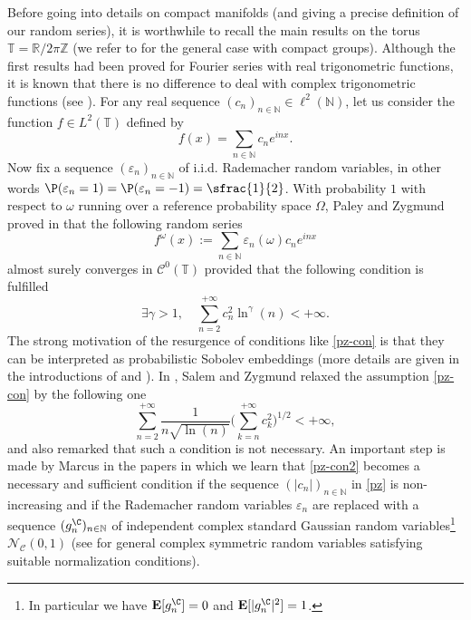 \documentclass[JEP,XML,SOM,Unicode,NoEqCountersInSection,published]{cedram}
\theoremstyle{theorem}
\theoremstyle{definition}
\newcommand\R{\mathbb{R}}
\newcommand\E{\mathbf{E}}
\newcommand\N{\mathbb{N}}
\newcommand\Z{\mathbb{Z}}
\newcommand\CC{\mathcal{C}}
\newcommand\ep{\varepsilon}
\begin{document}
Before going into details on compact manifolds (and giving a precise definition of our random series), it is worthwhile to recall the main results on the torus $\mathbb{T}=\R/ 2\pi \Z$ (we refer to \cite{pisier1981} for the general case with compact groups). Although the first results had been proved for Fourier series with real trigonometric functions, it is known that there is no difference to deal with complex trigonometric functions (see \cite[p.\,122]{pisier1981}). For any real sequence $(c_n)_{n\in \N}\in \ell^2(\N)$, let us consider the function $f\in L^2(\mathbb{T})$ defined by
\begin{equation*}
f(x)=\sum_{n\in \N}c_n e^{inx}.
\end{equation*}
Now fix a sequence $(\varepsilon_n)_{n\in \N}$ of i.i.d. Rademacher random variables, in other words $\P(\varepsilon_n=1)=\P(\varepsilon_n=-1)=\sfrac{1}{2}$.
With probability $1$ with respect to $\omega$ running over a reference probability space $\Omega$, Paley and Zygmund proved in \cite[p.\,347]{paley1930} that the following random series
\begin{equation}\label{pz}
f^\omega(x):=\sum_{n\in \N}\varepsilon_n(\omega) c_n e^{inx}
\end{equation}
almost surely converges in $\CC^0(\mathbb{T})$ provided that the following condition is fulfilled
\begin{equation}\label{pz-con}
\exists \gamma>1, \quad \sum_{n=2}^{+\infty} c_n^2 \ln^{\gamma}(n)<+\infty.
\end{equation}
The strong motivation of the resurgence of conditions like \eqref{pz-con} is that they can be interpreted as probabilistic Sobolev embeddings (more details are given in the introductions of \cite{Tzvetkov4,burq-lebeau} and \cite[p.\,2734]{imek-aif}).
In \cite[p.\,291]{salem1954}, Salem and Zygmund relaxed the assumption \eqref{pz-con} by the following one
\begin{equation}\label{pz-con2}
\sum_{n=2}^{+\infty} \frac{1}{n\sqrt{\ln(n)}}\biggl(\sum_{k=n}^{+\infty}c_k^2 \biggr)^{1/2} <+\infty,
\end{equation}
and also remarked that such a condition is not necessary.
An important step is made by Marcus in the papers \cite{marcus1973,marcus1975} in which we learn that \eqref{pz-con2} becomes a necessary and sufficient condition if the sequence $(|c_n|)_{n\in \N}$ in \eqref{pz} is non-increasing and if the Rademacher random variables $\ep_n$ are replaced with a sequence $(g_n^{\C})_{n\in \N}$ of independent complex standard Gaussian random variables\footnote{In particular we have $\E[g_n^\C]=0$ and $\E[|g_n^\C|^2]=1$.} $\mathcal{N}_\mathcal{C}(0,1)$ (see \cite{marcus1975} for general complex symmetric random variables satisfying suitable normalization conditions).
\end{document}
